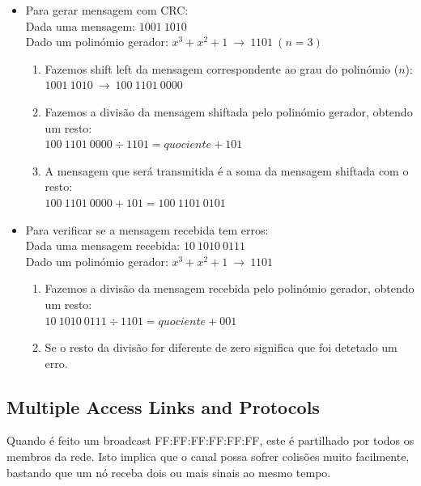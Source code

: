 \documentclass[12pt]{article}
\begin{document}
\begin{itemize}
    \item Para gerar mensagem com CRC: \\[4pt]
        Dada uma mensagem: $1001\ 1010$ \\
        Dado um polinómio gerador: $x^3+x^2+1 \ \rightarrow\  1101\ (n=3)$
        \begin{enumerate}
            \item Fazemos shift left da mensagem correspondente ao grau do polinómio ($n$): \\
            $1001\ 1010 \ \rightarrow\  100\ 1101\ 0000$
            \item Fazemos a divisão da mensagem shiftada pelo polinómio gerador, obtendo um resto: \\
            $100\ 1101\ 0000 \div 1101 = quociente + 101$
            \item A mensagem que será transmitida é a soma da mensagem shiftada com o resto: \\
            $100\ 1101\ 0000 + 101 = 100\ 1101\ 0101$ 
        \end{enumerate}
    \item Para verificar se a mensagem recebida tem erros: \\[4pt]
        Dada uma mensagem recebida: $10\ 1010\ 0111$ \\
        Dado um polinómio gerador: $x^3+x^2+1 \ \rightarrow\  1101$
        \begin{enumerate}
            \item Fazemos a divisão da mensagem recebida pelo polinómio gerador, obtendo um resto: \\
            $10\ 1010\ 0111 \div 1101 = quociente + 001$
            \item Se o resto da divisão for diferente de zero significa que foi detetado um erro.
        \end{enumerate}
\end{itemize}




\subsection{Multiple Access Links and Protocols}

Quando é feito um broadcast FF:FF:FF:FF:FF:FF, este é partilhado por todos os membros da rede. Isto implica que o canal possa sofrer colisões muito facilmente, bastando que um nó receba dois ou mais sinais ao mesmo tempo. \\
\end{document}
